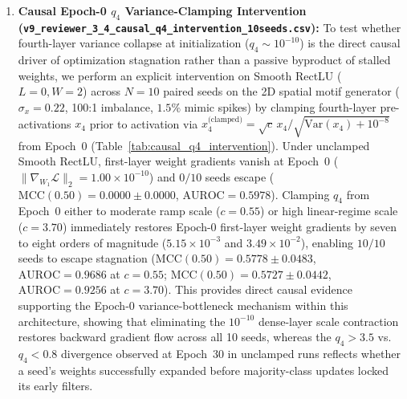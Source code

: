 \documentclass[11pt, a4paper]{article}
\begin{document}
\begin{enumerate}
\item \textbf{Causal Epoch-0 $q_4$ Variance-Clamping Intervention (\texttt{v9\_reviewer\_3\_4\_causal\_q4\_intervention\_10seeds.csv}):} To test whether fourth-layer variance collapse at initialization ($q_4 \sim 10^{-10}$) is the direct causal driver of optimization stagnation rather than a passive byproduct of stalled weights, we perform an explicit intervention on Smooth RectLU ($L=0, W=2$) across $N=10$ paired seeds on the 2D spatial motif generator ($\sigma_x = 0.22$, 100:1 imbalance, $1.5\%$ mimic spikes) by clamping fourth-layer pre-activations $x_4$ prior to activation via $x_4^{\text{(clamped)}} = \sqrt{c}\,x_4 / \sqrt{\mathrm{Var}(x_4) + 10^{-8}}$ from Epoch~0 (Table~\ref{tab:causal_q4_intervention}). Under unclamped Smooth RectLU, first-layer weight gradients vanish at Epoch~0 ($\|\nabla_{W_1}\mathcal{L}\|_2 = 1.00\times 10^{-10}$) and $0/10$ seeds escape ($\mathrm{MCC}(0.50) = 0.0000 \pm 0.0000$, $\mathrm{AUROC} = 0.5978$). Clamping $q_4$ from Epoch~0 either to moderate ramp scale ($c = 0.55$) or high linear-regime scale ($c = 3.70$) immediately restores Epoch-0 first-layer weight gradients by seven to eight orders of magnitude ($5.15\times 10^{-3}$ and $3.49\times 10^{-2}$), enabling $10/10$ seeds to escape stagnation ($\mathrm{MCC}(0.50) = 0.5778 \pm 0.0483$, $\mathrm{AUROC} = 0.9686$ at $c=0.55$; $\mathrm{MCC}(0.50) = 0.5727 \pm 0.0442$, $\mathrm{AUROC} = 0.9256$ at $c=3.70$). This provides direct causal evidence supporting the Epoch-0 variance-bottleneck mechanism within this architecture, showing that eliminating the $10^{-10}$ dense-layer scale contraction restores backward gradient flow across all 10 seeds, whereas the $q_4 > 3.5$ vs.\ $q_4 < 0.8$ divergence observed at Epoch~30 in unclamped runs reflects whether a seed's weights successfully expanded before majority-class updates locked its early filters.


\end{enumerate}
\end{document}
